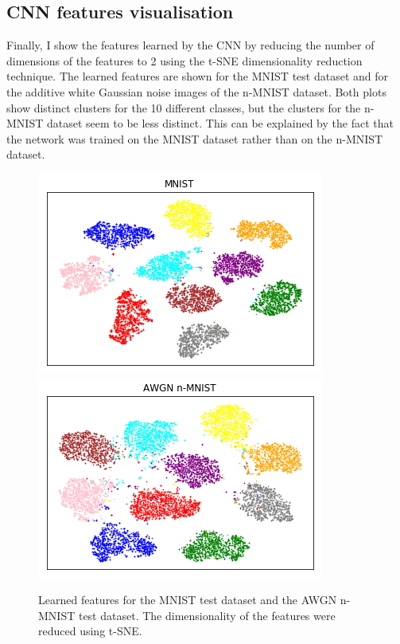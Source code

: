 \documentclass{article}
\begin{document}
\subsection{CNN features visualisation}
Finally, I show the features learned by the CNN by reducing the number of dimensions of the features to 2 using the t-SNE \cite{maaten2008visualizing} dimensionality reduction technique. The learned features are shown for the MNIST test dataset and for the additive white Gaussian noise images of the n-MNIST dataset. Both plots show distinct clusters for the 10 different classes, but the clusters for the n-MNIST dataset seem to be less distinct. This can be explained by the fact that the network was trained on the MNIST dataset rather than on the n-MNIST dataset.

\begin{figure}
	\centering
	\includegraphics[scale=0.48]{embeddings_visualisation.png}
	\includegraphics[scale=0.48]{noisy_embeddings_visualisation}
	\caption{Learned features for the MNIST test dataset and the AWGN n-MNIST test dataset. The dimensionality of the features were reduced using t-SNE.}
\end{figure}
\end{document}
